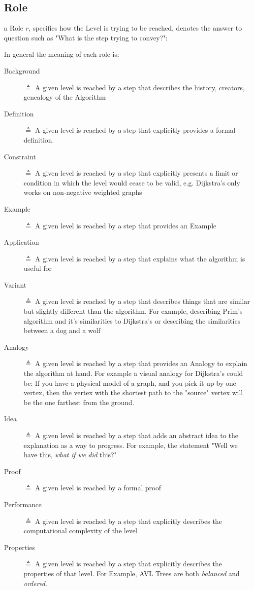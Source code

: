 \documentclass[10pt, letterpaper]{article}
\begin{document}
\subsection*{Role}
\label{sec:orgc4bd9b5}
a Role \(r\), specifies how the Level is trying to be reached, denotes the
answer to question such as "What is the step trying to convey?":

In general the meaning of each role is:
\begin{description}
\item[{Background}] \(\triangleq\) A given level is reached by a step that describes the history,
creators, genealogy of the Algorithm
\item[{Definition}] \(\triangleq\) A given level is reached by a step that explicitly provides a
formal definition.
\item[{Constraint}] \(\triangleq\) A given level is reached by a step that explicitly presents a
limit or condition in which the level would cease to be valid, e.g.
Dijkstra's only works on non-negative weighted graphs
\item[{Example}] \(\triangleq\) A given level is reached by a step that provides an Example
\item[{Application}] \(\triangleq\) A given level is reached by a step that explains what the
algorithm is useful for
\item[{Variant}] \(\triangleq\) A given level is reached by a step that describes things that are
similar but slightly different than the algorithm. For example, describing
Prim's algorithm and it's similarities to Dijkstra's or describing the
similarities between a dog and a wolf
\item[{Analogy}] \(\triangleq\) A given level is reached by a step that provides an Analogy to
explain the algorithm at hand. For example a visual analogy for Dijkstra's
could be: If you have a physical model of a graph, and you pick it up by
one vertex, then the vertex with the shortest path to the "source" vertex
will be the one farthest from the ground.
\item[{Idea}] \(\triangleq\) A given level is reached by a step that adds an abstract idea to the
explanation as a way to progress. For example, the statement "Well we have
this, \emph{what if we did} this?"
\item[{Proof}] \(\triangleq\) A given level is reached by a formal proof
\item[{Performance}] \(\triangleq\) A given level is reached by a step that explicitly describes
the computational complexity of the level
\item[{Properties}] \(\triangleq\) A given level is reached by a step that explicitly describes the properties of that level. For Example, AVL Trees are both \emph{balanced} and \emph{ordered}.
\end{description}
\end{document}
